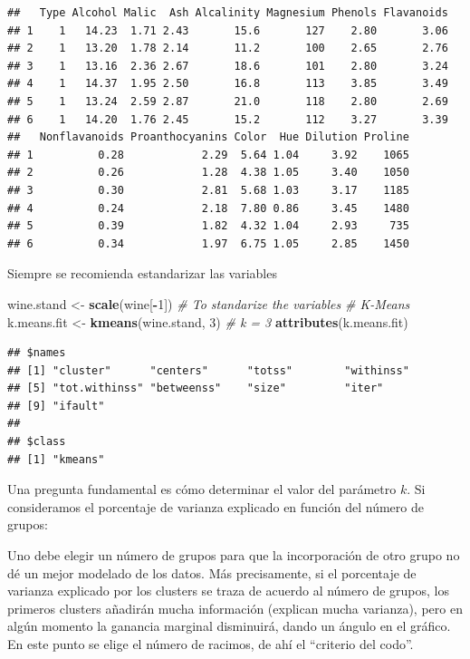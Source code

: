 \documentclass[]{book}
\newenvironment{Shaded}{\begin{snugshade}}{\end{snugshade}}
\newcommand{\KeywordTok}[1]{\textcolor[rgb]{0.13,0.29,0.53}{\textbf{#1}}}
\newcommand{\DecValTok}[1]{\textcolor[rgb]{0.00,0.00,0.81}{#1}}
\newcommand{\StringTok}[1]{\textcolor[rgb]{0.31,0.60,0.02}{#1}}
\newcommand{\CommentTok}[1]{\textcolor[rgb]{0.56,0.35,0.01}{\textit{#1}}}
\newcommand{\OperatorTok}[1]{\textcolor[rgb]{0.81,0.36,0.00}{\textbf{#1}}}
\newcommand{\NormalTok}[1]{#1}
\begin{document}
\begin{verbatim}
##   Type Alcohol Malic  Ash Alcalinity Magnesium Phenols Flavanoids
## 1    1   14.23  1.71 2.43       15.6       127    2.80       3.06
## 2    1   13.20  1.78 2.14       11.2       100    2.65       2.76
## 3    1   13.16  2.36 2.67       18.6       101    2.80       3.24
## 4    1   14.37  1.95 2.50       16.8       113    3.85       3.49
## 5    1   13.24  2.59 2.87       21.0       118    2.80       2.69
## 6    1   14.20  1.76 2.45       15.2       112    3.27       3.39
##   Nonflavanoids Proanthocyanins Color  Hue Dilution Proline
## 1          0.28            2.29  5.64 1.04     3.92    1065
## 2          0.26            1.28  4.38 1.05     3.40    1050
## 3          0.30            2.81  5.68 1.03     3.17    1185
## 4          0.24            2.18  7.80 0.86     3.45    1480
## 5          0.39            1.82  4.32 1.04     2.93     735
## 6          0.34            1.97  6.75 1.05     2.85    1450
\end{verbatim}

Siempre se recomienda estandarizar las variables

\begin{Shaded}
\begin{Highlighting}[]
\NormalTok{wine.stand <-}\StringTok{ }\KeywordTok{scale}\NormalTok{(wine[}\OperatorTok{-}\DecValTok{1}\NormalTok{])  }\CommentTok{# To standarize the variables}
\CommentTok{# K-Means}
\NormalTok{k.means.fit <-}\StringTok{ }\KeywordTok{kmeans}\NormalTok{(wine.stand, }\DecValTok{3}\NormalTok{) }\CommentTok{# k = 3}
\KeywordTok{attributes}\NormalTok{(k.means.fit)}
\end{Highlighting}
\end{Shaded}

\begin{verbatim}
## $names
## [1] "cluster"      "centers"      "totss"        "withinss"    
## [5] "tot.withinss" "betweenss"    "size"         "iter"        
## [9] "ifault"      
## 
## $class
## [1] "kmeans"
\end{verbatim}

Una pregunta fundamental es cómo determinar el valor del parámetro
\(k\). Si consideramos el porcentaje de varianza explicado en función
del número de grupos:

Uno debe elegir un número de grupos para que la incorporación de otro
grupo no dé un mejor modelado de los datos. Más precisamente, si el
porcentaje de varianza explicado por los clusters se traza de acuerdo al
número de grupos, los primeros clusters añadirán mucha información
(explican mucha varianza), pero en algún momento la ganancia marginal
disminuirá, dando un ángulo en el gráfico. En este punto se elige el
número de racimos, de ahí el ``criterio del codo''.
\end{document}
